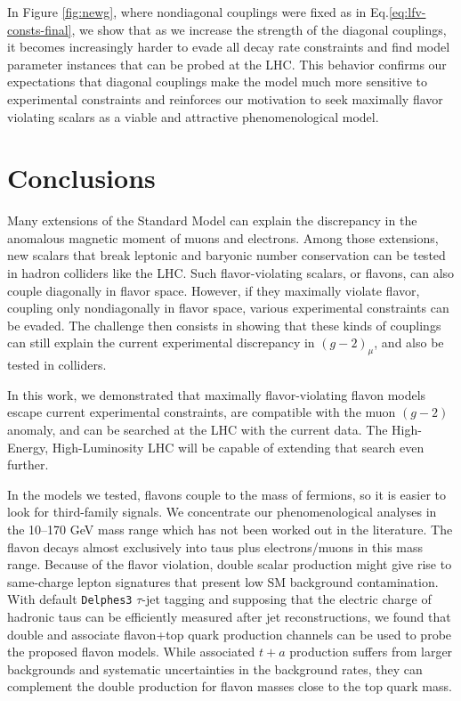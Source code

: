 \documentclass[prd,amsfonts,onecolumn,superscriptaddress,aps,nofootinbib,11pt]{revtex4-1}
\begin{document}
In Figure \ref{fig:newg}, where nondiagonal couplings were fixed as in Eq.\eqref{eq:lfv-consts-final}, we show that as we increase the strength of the diagonal couplings, it becomes increasingly harder to evade all decay rate constraints and find model parameter instances that can be probed at the LHC. This behavior confirms our expectations that diagonal couplings make the model much more sensitive to experimental constraints and reinforces our motivation to seek maximally flavor violating scalars as a viable and attractive phenomenological model.

\section{Conclusions}\label{conclusao}

 Many extensions of the Standard Model can explain the discrepancy in the anomalous magnetic moment of muons and electrons. Among those extensions, new scalars that break leptonic and baryonic number conservation can be tested in hadron colliders like the LHC. Such flavor-violating scalars, or flavons, can also couple diagonally in flavor space. However, if they maximally violate flavor, coupling only nondiagonally in flavor space, various experimental constraints can be evaded. The challenge then consists in showing that these kinds of couplings can still explain the current experimental discrepancy in $(g-2)_\mu$, and also be tested in colliders.

 In this work, we demonstrated that maximally flavor-violating flavon models escape current experimental constraints, are compatible with the muon $(g-2)$ anomaly, and can be searched at the LHC with the current data. The High-Energy, High-Luminosity LHC will be capable of extending that search even further.

 In the models we tested, flavons couple to the mass of fermions, so it is easier to look for third-family signals. We concentrate our phenomenological analyses in the 10--170 GeV mass range which has not been worked out in the literature. The flavon decays almost exclusively into taus plus electrons/muons in this mass range. Because of the flavor violation, double scalar production might give rise to same-charge lepton signatures that present low SM background contamination. With default \texttt{Delphes3} $\tau$-jet tagging and supposing that the electric charge of hadronic taus can be efficiently measured after jet reconstructions, we found that double and associate flavon+top quark production channels can be used to probe the proposed flavon models. While associated $t+a$ production suffers from larger backgrounds and systematic uncertainties in the background rates, they can complement the double production for flavon masses close to the top quark mass.
\end{document}
